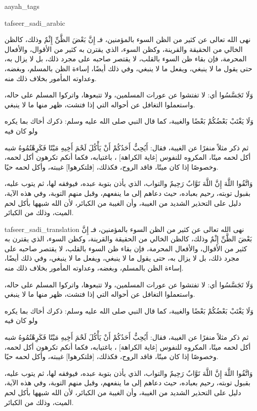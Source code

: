 \begin{taggedblock}{aayah_tags}
\end{taggedblock}
\begin{taggedblock}{tafseer_sadi_arabic}
\begin{Arabic}
نهى الله تعالى عن كثير من الظن السوء  بالمؤمنين، فـ
{ إِنَّ بَعْضَ الظَّنِّ إِثْمٌ }
وذلك، كالظن الخالي من الحقيقة والقرينة، وكظن السوء، الذي يقترن به كثير من الأقوال، والأفعال المحرمة، فإن بقاء ظن السوء بالقلب، لا يقتصر صاحبه على مجرد ذلك، بل لا يزال به، حتى يقول ما لا ينبغي، ويفعل ما لا ينبغي، وفي ذلك أيضًا، إساءة الظن بالمسلم، وبغضه، وعداوته المأمور بخلاف ذلك منه.

{ وَلَا تَجَسَّسُوا }
أي: لا تفتشوا عن عورات المسلمين، ولا تتبعوها، واتركوا  المسلم على حاله، واستعملوا التغافل عن أحواله  التي إذا فتشت، ظهر منها ما لا ينبغي.

{ وَلَا يَغْتَبْ بَعْضُكُمْ بَعْضًا }
والغيبة، كما قال النبي صلى الله عليه وسلم:
{ ذكرك أخاك بما يكره ولو كان فيه }

ثم ذكر مثلاً منفرًا عن الغيبة، فقال:
{ أَيُحِبُّ أَحَدُكُمْ أَنْ يَأْكُلَ لَحْمَ أَخِيهِ مَيْتًا فَكَرِهْتُمُوهُ }
شبه أكل لحمه ميتًا، المكروه للنفوس
[غاية الكراهة]
، باغتيابه، فكما أنكم تكرهون أكل لحمه، وخصوصًا إذا كان ميتًا، فاقد الروح، فكذلك،
[فلتكرهوا]
غيبته، وأكل لحمه حيًا.

{ وَاتَّقُوا اللَّهَ إِنَّ اللَّهَ تَوَّابٌ رَحِيمٌ }
والتواب، الذي يأذن بتوبة عبده، فيوفقه لها، ثم يتوب عليه، بقبول توبته، رحيم بعباده، حيث دعاهم إلى ما ينفعهم، وقبل منهم التوبة، وفي هذه الآية، دليل على التحذير الشديد من الغيبة، وأن الغيبة من الكبائر، لأن الله شبهها بأكل لحم الميت، وذلك من الكبائر.
\end{Arabic}
\end{taggedblock}
\begin{taggedblock}{tafseer_sadi_translation}
نهى الله تعالى عن كثير من الظن السوء  بالمؤمنين، فـ
{ إِنَّ بَعْضَ الظَّنِّ إِثْمٌ }
وذلك، كالظن الخالي من الحقيقة والقرينة، وكظن السوء، الذي يقترن به كثير من الأقوال، والأفعال المحرمة، فإن بقاء ظن السوء بالقلب، لا يقتصر صاحبه على مجرد ذلك، بل لا يزال به، حتى يقول ما لا ينبغي، ويفعل ما لا ينبغي، وفي ذلك أيضًا، إساءة الظن بالمسلم، وبغضه، وعداوته المأمور بخلاف ذلك منه.

{ وَلَا تَجَسَّسُوا }
أي: لا تفتشوا عن عورات المسلمين، ولا تتبعوها، واتركوا  المسلم على حاله، واستعملوا التغافل عن أحواله  التي إذا فتشت، ظهر منها ما لا ينبغي.

{ وَلَا يَغْتَبْ بَعْضُكُمْ بَعْضًا }
والغيبة، كما قال النبي صلى الله عليه وسلم:
{ ذكرك أخاك بما يكره ولو كان فيه }

ثم ذكر مثلاً منفرًا عن الغيبة، فقال:
{ أَيُحِبُّ أَحَدُكُمْ أَنْ يَأْكُلَ لَحْمَ أَخِيهِ مَيْتًا فَكَرِهْتُمُوهُ }
شبه أكل لحمه ميتًا، المكروه للنفوس
[غاية الكراهة]
، باغتيابه، فكما أنكم تكرهون أكل لحمه، وخصوصًا إذا كان ميتًا، فاقد الروح، فكذلك،
[فلتكرهوا]
غيبته، وأكل لحمه حيًا.

{ وَاتَّقُوا اللَّهَ إِنَّ اللَّهَ تَوَّابٌ رَحِيمٌ }
والتواب، الذي يأذن بتوبة عبده، فيوفقه لها، ثم يتوب عليه، بقبول توبته، رحيم بعباده، حيث دعاهم إلى ما ينفعهم، وقبل منهم التوبة، وفي هذه الآية، دليل على التحذير الشديد من الغيبة، وأن الغيبة من الكبائر، لأن الله شبهها بأكل لحم الميت، وذلك من الكبائر.
\end{taggedblock}
